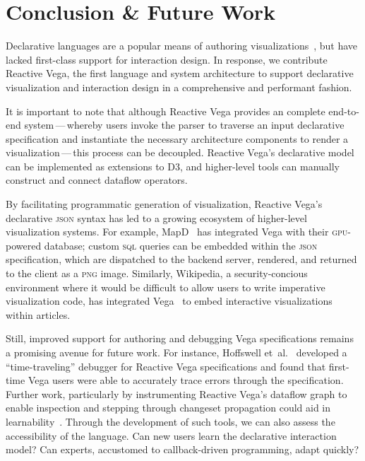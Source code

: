 
\vspace{-20pt}

\section{Conclusion \& Future Work}
\label{sec:vg:conclusion}

\vspace{-7pt}

Declarative languages are a popular means of authoring
visualizations~\cite{bostock:protovis, bostock:d3, heer:protovisjava}, but have
lacked first-class support for interaction design. In response, we contribute
Reactive Vega, the first language and system architecture to support declarative
visualization and interaction design in a comprehensive and performant fashion.

It is important to note that although Reactive Vega provides an complete
end\--to\--end system\,---\,whereby users invoke the parser to traverse an input
declarative specification and instantiate the necessary architecture components
to render a visualization\,---\,this process can be decoupled. Reactive Vega's
declarative model can be implemented as extensions to D3, and higher-level tools
can manually construct and connect dataflow operators.

By facilitating programmatic generation of visualization, Reactive Vega's
declarative \textsc{json} syntax has led to a growing ecosystem of higher-level
visualization systems. For example, MapD~\cite{mapd:vega} has integrated Vega
with their \textsc{gpu}-powered database; custom \textsc{sql} queries can be
embedded within the \textsc{json} specification, which are dispatched to the
backend server, rendered, and returned to the client as a \textsc{png} image.
Similarly, Wikipedia, a security-concious environment where it would be
difficult to allow users to write imperative visualization code, has integrated
Vega~\cite{mediawiki:graph} to embed interactive visualizations within articles.

Still, improved support for authoring and debugging Vega specifications remains
a promising avenue for future work. For instance, Hoffswell
et~al.~\cite{hoffswell:debugging} developed a ``time-traveling'' debugger for
Reactive Vega specifications and found that first-time Vega users were able to
accurately trace errors through the specification. Further work, particularly by
instrumenting Reactive Vega's dataflow graph to enable inspection and stepping
through changeset propagation could aid in learnability~\cite{guo:tutor}.
Through the development of such tools, we can also assess the accessibility of
the language. Can new users learn the declarative interaction model? Can
experts, accustomed to callback-driven programming, adapt quickly?

